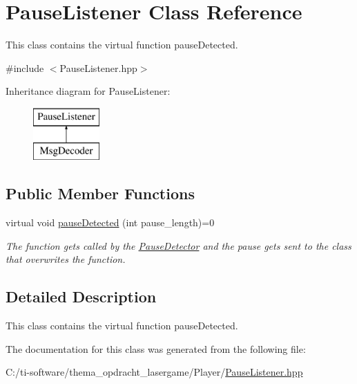\hypertarget{class_pause_listener}{}\section{Pause\+Listener Class Reference}
\label{class_pause_listener}


This class contains the virtual function pause\+Detected.  




{\ttfamily \#include $<$Pause\+Listener.\+hpp$>$}

Inheritance diagram for Pause\+Listener\+:\begin{figure}[H]
\begin{center}
\leavevmode
\includegraphics[height=2.000000cm]{class_pause_listener}
\end{center}
\end{figure}
\subsection*{Public Member Functions}
\begin{DoxyCompactItemize}
\item 
\mbox{\label{class_pause_listener_ad2a8cbca3aa46215a54b96bfc84cc78b}} 
virtual void \mbox{\hyperlink{class_pause_listener_ad2a8cbca3aa46215a54b96bfc84cc78b}{pause\+Detected}} (int pause\+\_\+length)=0
\begin{DoxyCompactList}\small\item\em The function gets called by the \mbox{\hyperlink{class_pause_detector}{Pause\+Detector}} and the pause gets sent to the class that overwrites the function. \end{DoxyCompactList}\end{DoxyCompactItemize}


\subsection{Detailed Description}
This class contains the virtual function pause\+Detected. 

The documentation for this class was generated from the following file\+:\begin{DoxyCompactItemize}
\item 
C\+:/ti-\/software/thema\+\_\+opdracht\+\_\+lasergame/\+Player/\mbox{\hyperlink{_pause_listener_8hpp}{Pause\+Listener.\+hpp}}\end{DoxyCompactItemize}
